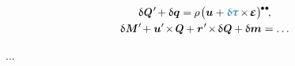 \nopagebreak\vspace{-0.2em}\begin{gather*}
\variation{\hspace{.1ex}\internalforce}{\hspace{.25ex}'} \hspace{-0.3ex} + \variation{\bm{q}}
= \hspace{-0.1ex} \rho \hspace{.15ex} \bigl( \fieldofdisplacements + \varbivalent{\hspace{-0.2ex}\cauchystress} \hspace{-0.2ex} \times \hspace{-0.3ex} \infinitesimaldeformation \bigr)^{ \hspace{-0.1ex} \tikz[baseline=-0.2ex] \draw[black, fill=black] (0,0) circle (.28ex); \hspace{.25ex} \tikz[baseline=-0.2ex] \draw[black, fill=black] (0,0) circle (.28ex); }
\hspace{-0.2ex} ,
\\
%
\variation{\hspace{.1ex}\internalmoment}{\hspace{.25ex}'} \hspace{-0.3ex} + \fieldofdisplacements{'} \hspace{-0.3ex} \times \hspace{-0.2ex} \internalforce + \locationvector{\hspace{.1ex}'} \hspace{-0.3ex} \times \hspace{-0.2ex} \variation{\hspace{.1ex}\internalforce} + \variation{\internaldistributedmoment}
= \ldots
\end{gather*}

...




\label{section:rods.nonshearmodelwithextension}

